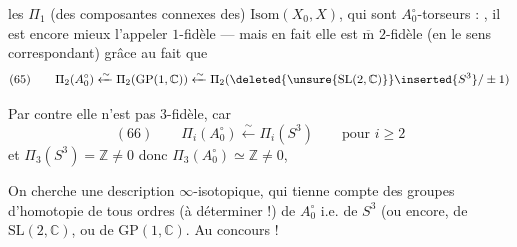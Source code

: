 les $\Pi_1$  (des composantes connexes des)
$\mathrm{Isom}(X_0,X)$, qui sont  $A_0^\circ$-torseurs
 : , il est
encore mieux l'appeler $1$-fidèle ---
mais en fait elle est $\overline{\mathrm m}$ $2$-fidèle
(en le sens correspondant) grâce au
fait que
\[
(65)\qquad
\Pi_2(A_0^\circ)\xleftarrow{\sim}\Pi_2(\mathrm{GP}(1,\mathbb C))
\xleftarrow{\sim}\Pi_2(\deleted{\unsure{\mathrm{SL}(2,\mathbb C)}}\inserted{S^3}/\pm1)
\]

Par contre elle n'est pas $3$-fidèle, car
\[
(66)\qquad \Pi_i(A_0^\circ)\xleftarrow{\sim}\Pi_i(S^3)
\qquad\text{pour }i\geq2
\]
et $\Pi_3(S^3)=\mathbb Z\ne0$ donc $\Pi_3(A_0^\circ)\simeq\mathbb Z\ne0$,

On cherche une description $\infty$-isotopique,
qui tienne compte des groupes d'homotopie
de tous ordres (à déterminer !) de
$A_0^\circ$ i.e. de $S^3$ (ou encore, de $\mathrm{SL}(2,\mathbb C)$,
ou de $\mathrm{GP}(1,\mathbb C)$. Au concours !

